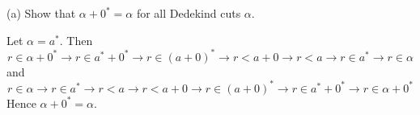 
(a) Show that $\alpha+0^*=\alpha$ for all Dedekind cuts $\alpha$.

\bigskip
\noindent
Let $\alpha=a^*$. Then
$$
r\in\alpha+0^*
\longrightarrow
r\in a^*+0^*
\longrightarrow
r\in(a+0)^*
\longrightarrow
r<a+0
\longrightarrow
r<a
\longrightarrow
r\in a^*
\longrightarrow
r\in\alpha
$$
and
$$
r\in\alpha
\longrightarrow
r\in a^*
\longrightarrow
r<a
\longrightarrow
r<a+0
\longrightarrow
r\in(a+0)^*
\longrightarrow
r\in a^*+0^*
\longrightarrow
r\in\alpha+0^*
$$
Hence $\alpha+0^*=\alpha$.
